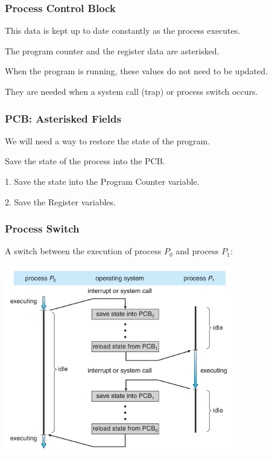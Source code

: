 \begin{frame}
\frametitle{Process Control Block}

This data is kept up to date constantly as the process executes.  

The program counter and the register data are asterisked. 

When the program is running, these values do not need to be updated. 

They are needed when a system call (trap) or process switch occurs.

\end{frame}

\begin{frame}
\frametitle{PCB: Asterisked Fields}
We will need a way to restore the state of the program. 

Save the state of the process into the PCB. 

1. Save the state into the Program Counter variable. 

2. Save the Register variables.

\end{frame}

\begin{frame}
\frametitle{Process Switch}

A switch between the execution of process $P_{0}$ and process $P_{1}$:

\begin{center}
\includegraphics[width=0.75\textwidth]{images/process-switch.png}
\end{center}

\end{frame}


